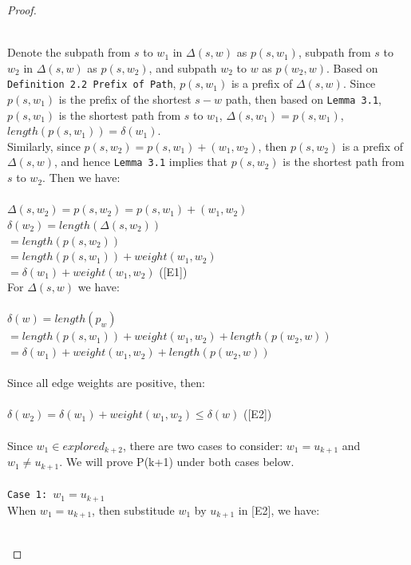 \documentclass[11pt, oneside]{article}   	%
\newcommand\tab[1][1cm]{\hspace*{#1}}
\newcommand\ftab[1][5cm]{\hspace*{#1}}
\newcommand\tsp[1][0.2cm]{\hspace*{#1}}
\theoremstyle{definition}
\begin{document}
\begin{proof}
\begin{itemize}
\begin{enumerate}
\begin{center}
  \end{center}
  \tab\\
  Denote the subpath from $s$ to $w_1$ in $\Delta(s, w)$ as $p(s, w_1)$, subpath from $s$ to $w_2$ in $\Delta(s, w)$ as $p(s, w_2)$, and subpath $w_2$ to $w$ as $p(w_2, w)$. Based on \texttt{Definition 2.2 Prefix of Path}, $p(s, w_1)$ is a prefix of $\Delta(s, w)$. Since $p(s, w_1)$ is the prefix of the shortest $s-w$ path, then based on \texttt{Lemma 3.1}, $p(s, w_1)$ is the shortest path from $s$ to $w_1$, $\Delta(s, w_1) = p(s, w_1)$, $length(p(s, w_1)) = \delta(w_1)$. 
  \\
  Similarly, since $p(s, w_2) = p(s, w_1) + (w_1, w_2)$, then $p(s, w_2)$ is a prefix of $\Delta(s, w)$, and hence \texttt{Lemma 3.1} implies that $p(s, w_2)$ is the shortest path from $s$ to $w_2$. Then we have: 
  \\\\
  \ftab $\Delta(s, w_2) = p(s, w_2) = p(s, w_1) + (w_1, w_2)$ \\
  \ftab $\delta(w_2) = length(\Delta(s, w_2))$ \\
  \ftab\tab $= length(p(s, w_2))$ \\
  \ftab\tab $= length(p(s, w_1)) + weight(w_1, w_2)$\\
  \ftab\tab $= \delta(w_1) + weight(w_1, w_2)$ ([E1])
  \\
  For $\Delta(s, w)$ we have: 
  \\\\
    \tab\tsp $\delta(w) = length(p_w)$ \\
    \tab\tab $= length(p(s, w_1)) + weight(w_1, w_2) + length(p(w_2, w))$ \\
    \tab\tab $= \delta(w_1) + weight(w_1, w_2) + length(p(w_2, w))$
  \\\\
  Since all edge weights are positive, then: 
  \\\\
    \tab $\delta(w_2) = \delta(w_1) + weight(w_1, w_2) \leq \delta(w)$ ([E2])
  \\\\
  Since $w_1 \in explored_{k+2}$, there are two cases to consider: $w_1 =u_{k+1}$ and $w_1 \neq u_{k+1}$. We will prove P(k+1) under both cases below. 
  \\\\
  \texttt{Case 1: $w_1 = u_{k+1}$}
  \\
  When $w_1 = u_{k+1}$, then substitude $w_1$ by $u_{k+1}$ in [E2], we have: 
  \\\\

\end{enumerate}
\end{itemize}
\end{proof}
\end{document}
